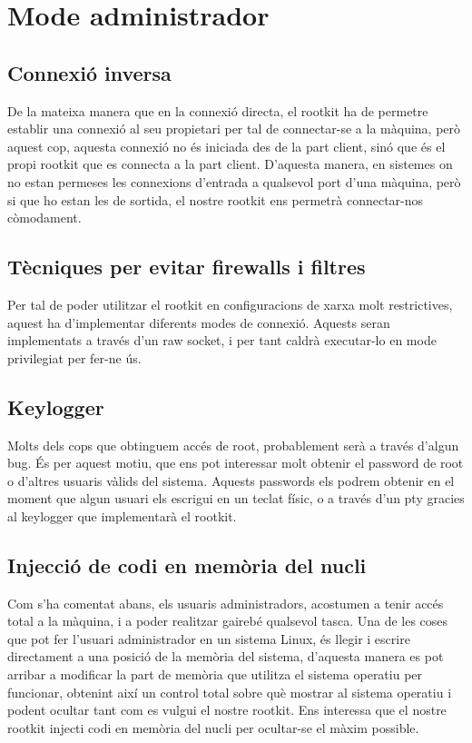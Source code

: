 \section{Mode administrador}

\subsection{Connexió inversa}
De la mateixa manera que en la connexió directa, el rootkit ha de permetre establir una connexió al seu propietari per tal de connectar-se
a la màquina, però aquest cop, aquesta connexió no és iniciada des de la part client, sinó que és el propi rootkit que es connecta 
a la part client. D'aquesta manera, en sistemes on no estan permeses les connexions d'entrada a qualsevol port d'una màquina, però si
que ho estan les de sortida, el nostre rootkit ens permetrà connectar-nos còmodament.

\subsection{Tècniques per evitar firewalls i filtres}
Per tal de poder utilitzar el rootkit en configuracions de xarxa molt restrictives, aquest ha d'implementar diferents modes de connexió.
Aquests seran implementats a través d'un raw socket, i per tant caldrà executar-lo en mode privilegiat per fer-ne ús.

\subsection{Keylogger}
Molts dels cops que obtinguem accés de root, probablement serà a través d'algun bug. És per aquest motiu, que ens pot interessar molt
obtenir el password de root o d'altres usuaris vàlids del sistema. Aquests passwords els podrem obtenir en el moment que algun usuari
els escrigui en un teclat físic, o a través d'un pty gracies al keylogger que implementarà el rootkit.

\subsection{Injecció de codi en memòria del nucli}
Com s'ha comentat abans, els usuaris administradors, acostumen a tenir accés total a la màquina, i a poder realitzar gairebé qualsevol tasca.
Una de les coses que pot fer l'usuari administrador en un sistema Linux, és llegir i escrire directament a una posició de la
memòria del sistema, d'aquesta manera es pot arribar a modificar la part de memòria que utilitza el sistema operatiu per funcionar,
obtenint així un control total sobre què mostrar al sistema operatiu i podent ocultar tant com es vulgui el nostre rootkit.
Ens interessa que el nostre rootkit injecti codi en memòria del nucli per ocultar-se el màxim possible.




